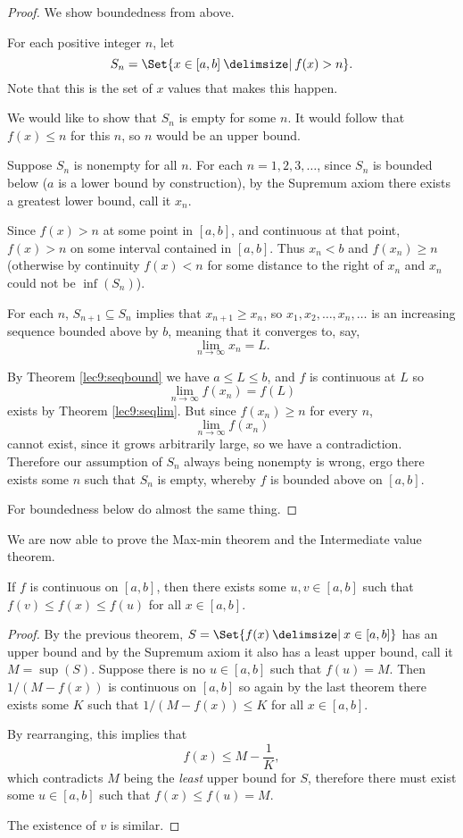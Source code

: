 \begin{proof}
	We show boundedness from above.

	For each positive integer $n$, let
	\[
		S_n = \Set{x \in [a, b] \given f(x) > n}.
	\]
	Note that this is the set of $x$ values that makes this happen.

	We would like to show that $S_n$ is empty for some $n$. It would follow that $f(x) \leq n$ for this $n$, so $n$ would be an upper bound.

	Suppose $S_n$ is nonempty for all $n$. For each $n = 1, 2, 3, \ldots$, since $S_n$ is bounded below ($a$ is a lower bound by construction), by the Supremum axiom there exists a greatest lower bound, call it $x_n$.

	Since $f(x) > n$ at some point in $[a, b]$, and continuous at that point, $f(x) > n$ on some interval contained in $[a, b]$. Thus $x_n < b$ and $f(x_n) \geq n$ (otherwise by continuity $f(x) < n$ for some distance to the right of $x_n$ and $x_n$ could not be $\inf(S_n)$).

	For each $n$, $S_{n + 1} \subseteq S_n$ implies that $x_{n + 1} \geq x_n$, so $x_1, x_2, \ldots, x_n, \ldots$ is an increasing sequence bounded above by $b$, meaning that it converges to, say,
	\[
		\lim_{n \to \infty} x_n = L.
	\]

	\noindent
	By Theorem \ref{lec9:seqbound} we have $a \leq L \leq b$, and $f$ is continuous at $L$ so
	\[
		\lim_{n \to \infty} f(x_n) = f(L)
	\]
	exists by Theorem \ref{lec9:seqlim}. But since $f(x_n) \geq n$ for every $n$,
	\[
		\lim_{n \to \infty} f(x_n)
	\]
	cannot exist, since it grows arbitrarily large, so we have a contradiction. Therefore our assumption of $S_n$ always being nonempty is wrong, ergo there exists some $n$ such that $S_n$ is empty, whereby $f$ is bounded above on $[a, b]$.

	For boundedness below do almost the same thing.
\end{proof}

\noindent
We are now able to prove the Max-min theorem and the Intermediate value theorem.

\begin{theorem}
	If $f$ is continuous on $[a, b]$, then there exists some $u, v \in [a, b]$ such that $f(v) \leq f(x) \leq f(u)$ for all $x \in [a, b]$.
\end{theorem}

\begin{proof}
	By the previous theorem, $S = \Set{f(x) \given x \in [a, b]}$ has an upper bound and by the Supremum axiom it also has a least upper bound, call it $M = \sup(S)$. Suppose there is no $u \in [a, b]$ such that $f(u) = M$. Then $1 / (M - f(x))$ is continuous on $[a, b]$ so again by the last theorem there exists some $K$ such that $1 / (M - f(x)) \leq K$ for all $x \in [a, b]$.

	By rearranging, this implies that
	\[
		f(x) \leq M - \frac{1}{K},
	\]
	which contradicts $M$ being the \emph{least} upper bound for $S$, therefore there must exist some $u \in [a, b]$ such that $f(x) \leq f(u) = M$.

	The existence of $v$ is similar.
\end{proof}

